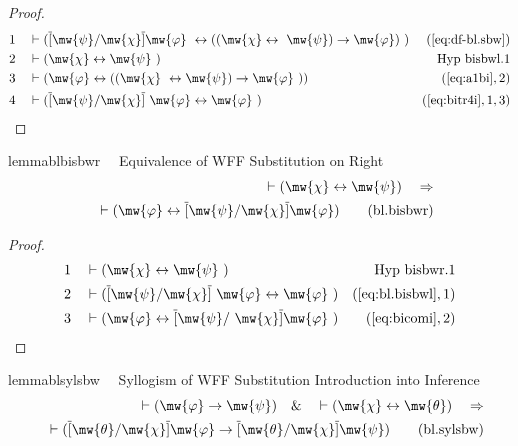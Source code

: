 \begin{proof}
\begin{align}
  1 &&  & \vdash ( \overline{[} \mw{\psi} / \mw{\chi} \overline{]} \mw{\varphi}
     ~\leftrightarrow ( ( \mw{\chi} \leftrightarrow
     ~\mw{\psi} ) \rightarrow \mw{\varphi} )
     ~)&(\mbox{\ref{eq:df-bl.sbw}})\notag
  \\ 2 &&  & \vdash ( \mw{\chi} \leftrightarrow \mw{\psi}
     ~)&\text{Hyp~bisbwl.1}\notag%
  \\ 3 &&  & \vdash ( \mw{\varphi} \leftrightarrow ( ( \mw{\chi}
     ~\leftrightarrow \mw{\psi} ) \rightarrow \mw{\varphi}
     ~) )&(\mbox{\ref{eq:a1bi}},2)\notag
  \\ 4 &&  & \vdash ( \overline{[} \mw{\psi} / \mw{\chi} \overline{]}
     ~\mw{\varphi} \leftrightarrow \mw{\varphi}
     ~)&(\mbox{\ref{eq:bitr4i}},1,3)\notag
\end{align}
\end{proof}

\begin{restatable}{lemma}{blbisbwr}~~ Equivalence of WFF Substitution on Right
\begin{align}
\vdash ( \mw{\chi} \leftrightarrow \mw{\psi} )\quad\Rightarrow \notag \\ 
	\quad \vdash (
    \mw{\varphi} \leftrightarrow \overline{[} \mw{\psi} / \mw{\chi}
    \overline{]} \mw{\varphi} )\label{eq:bl.bisbwr}\tag{bl.bisbwr}
\end{align}
\end{restatable}

\begin{proof}
\begin{align}
  1 &&  & \vdash ( \mw{\chi} \leftrightarrow \mw{\psi}
     ~)&\text{Hyp~bisbwr.1}\notag%
  \\ 2 &&  & \vdash ( \overline{[} \mw{\psi} / \mw{\chi} \overline{]}
     ~\mw{\varphi} \leftrightarrow \mw{\varphi}
     ~)&(\mbox{\ref{eq:bl.bisbwl}},1)\notag
  \\ 3 &&  & \vdash ( \mw{\varphi} \leftrightarrow \overline{[} \mw{\psi} /
     ~\mw{\chi} \overline{]} \mw{\varphi}
     ~)&(\mbox{\ref{eq:bicomi}},2)\notag
\end{align}
\end{proof}

\begin{restatable}{lemma}{blsylsbw}~~ Syllogism of WFF Substitution
Introduction into Inference
\begin{align}
\vdash ( \mw{\varphi} \rightarrow \mw{\psi} )\quad\&\quad \vdash ( \mw{\chi}
    \leftrightarrow \mw{\theta} )\quad\Rightarrow \notag \\ 
	\quad \vdash ( \overline{[}
    \mw{\theta} / \mw{\chi} \overline{]} \mw{\varphi} \rightarrow \overline{[}
    \mw{\theta} / \mw{\chi} \overline{]} \mw{\psi}
    )\label{eq:bl.sylsbw}\tag{bl.sylsbw}
\end{align}
\end{restatable}

